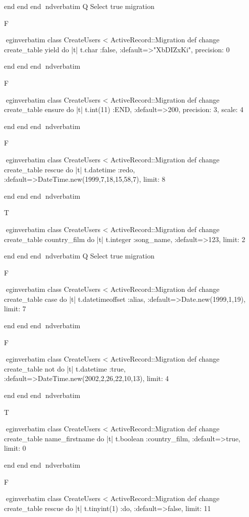     end 
  end 
end
nd{verbatim}
Q
 Select true migration

F

egin{verbatim}
 class CreateUsers < ActiveRecord::Migration 
  def change 
    create_table yield do |t| 
      t.char :false, :default=>"XbDIZxKi", precision: 0
    
    end 
  end 
end
nd{verbatim}

F

egin{verbatim}
 class CreateUsers < ActiveRecord::Migration 
  def change 
    create_table ensure do |t| 
      t.int(11) :END, :default=>200, precision: 3, scale: 4
    
    end 
  end 
end
nd{verbatim}

F

egin{verbatim}
 class CreateUsers < ActiveRecord::Migration 
  def change 
    create_table rescue do |t| 
      t.datetime :redo, :default=>DateTime.new(1999,7,18,15,58,7), limit: 8
    
    end 
  end 
end
nd{verbatim}

T

egin{verbatim}
 class CreateUsers < ActiveRecord::Migration 
  def change 
    create_table country_film do |t| 
      t.integer :song_name, :default=>123, limit: 2
    
    end 
  end 
end
nd{verbatim}
Q
 Select true migration

F

egin{verbatim}
 class CreateUsers < ActiveRecord::Migration 
  def change 
    create_table case do |t| 
      t.datetimeoffset :alias, :default=>Date.new(1999,1,19), limit: 7
    
    end 
  end 
end
nd{verbatim}

F

egin{verbatim}
 class CreateUsers < ActiveRecord::Migration 
  def change 
    create_table not do |t| 
      t.datetime :true, :default=>DateTime.new(2002,2,26,22,10,13), limit: 4
    
    end 
  end 
end
nd{verbatim}

T

egin{verbatim}
 class CreateUsers < ActiveRecord::Migration 
  def change 
    create_table name_firstname do |t| 
      t.boolean :country_film, :default=>true, limit: 0
    
    end 
  end 
end
nd{verbatim}

F

egin{verbatim}
 class CreateUsers < ActiveRecord::Migration 
  def change 
    create_table rescue do |t| 
      t.tinyint(1) :do, :default=>false, limit: 11
    
